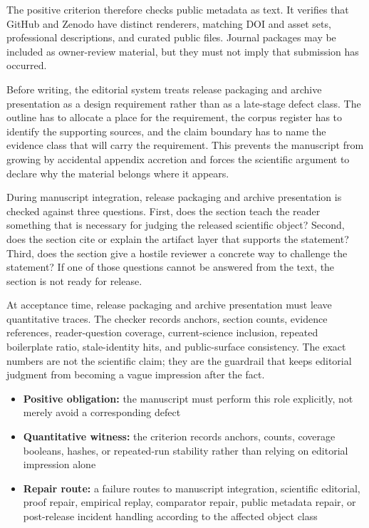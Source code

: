 The positive criterion therefore checks public metadata as text. It verifies that GitHub and Zenodo have distinct renderers, matching DOI and asset sets, professional descriptions, and curated public files. Journal packages may be included as owner-review material, but they must not imply that submission has occurred.


Before writing, the editorial system treats release packaging and archive presentation as a design requirement rather than as a late-stage defect class. The outline has to allocate a place for the requirement, the corpus register has to identify the supporting sources, and the claim boundary has to name the evidence class that will carry the requirement. This prevents the manuscript from growing by accidental appendix accretion and forces the scientific argument to declare why the material belongs where it appears.


During manuscript integration, release packaging and archive presentation is checked against three questions. First, does the section teach the reader something that is necessary for judging the released scientific object? Second, does the section cite or explain the artifact layer that supports the statement? Third, does the section give a hostile reviewer a concrete way to challenge the statement? If one of those questions cannot be answered from the text, the section is not ready for release.


At acceptance time, release packaging and archive presentation must leave quantitative traces. The checker records anchors, section counts, evidence references, reader-question coverage, current-science inclusion, repeated boilerplate ratio, stale-identity hits, and public-surface consistency. The exact numbers are not the scientific claim; they are the guardrail that keeps editorial judgment from becoming a vague impression after the fact.


\begin{itemize}[leftmargin=1.8em]

\item \textbf{Positive obligation:} the manuscript must perform this role explicitly, not merely avoid a corresponding defect

\item \textbf{Quantitative witness:} the criterion records anchors, counts, coverage booleans, hashes, or repeated-run stability rather than relying on editorial impression alone

\item \textbf{Repair route:} a failure routes to manuscript integration, scientific editorial, proof repair, empirical replay, comparator repair, public metadata repair, or post-release incident handling according to the affected object class

\end{itemize}

